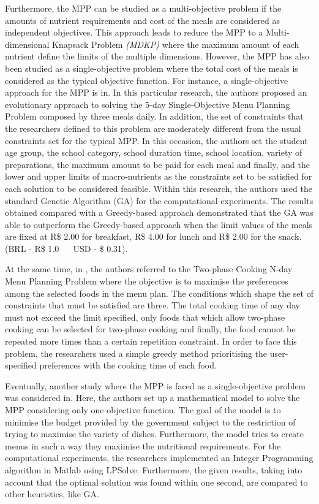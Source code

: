Furthermore, the MPP can be studied as a multi-objective problem\cite{Seljak2009} if the amounts of nutrient requirements and cost of the meals are considered as independent objectives. This approach leads to reduce the MPP to a Multi-dimensional Knapsack Problem \textit{(MDKP)} where the maximum amount of each nutrient define the limits of the multiple dimensions. However, the MPP has also been studied as a single-objective problem where the total cost of the meals is considered as the typical objective function. For instance, a single-objective approach for the MPP is in\cite{Moreira2018}. In this particular research, the authors proposed an evolutionary approach to solving the 5-day Single-Objective Menu Planning Problem composed by three meals daily. In addition, the set of constraints that the researchers defined to this problem are moderately different from the usual constraints set for the typical MPP. In this occasion, the authors set the student age group, the school category, school duration time, school location, variety of preparations, the maximum amount to be paid for each meal and finally, and the lower and upper limits of macro-nutrients as the constraints set to be satisfied for each solution to be considered feasible. Within this research, the authors used the standard Genetic Algorithm (GA) for the computational experiments. The results obtained compared with a Greedy-based approach demonstrated that the GA was able to outperform the Greedy-based approach when the limit values of the meals are fixed at R\$ 2.00 for breakfast, R\$ 4.00 for lunch and R\$ 2.00 for the snack. (BRL - R\$ 1.0 ~~ USD - \$ 0.31).

At the same time, in \cite{Funabiki2011}, the authors referred to the Two-phase Cooking N-day Menu Planning Problem where the objective is to maximise the preferences among the selected foods in the menu plan. The conditions which shape the set of constraints that must be satisfied are three. The total cooking time of any day must not exceed the limit specified, only foods that which allow two-phase cooking can be selected for two-phase cooking and finally, the food cannot be repeated more times than a certain repetition constraint. In order to face this problem, the researchers used a simple greedy method prioritising the user-specified preferences with the cooking time of each food.

Eventually, another study where the MPP is faced as a single-objective problem was considered in\cite{Sufahani2014}. Here, the authors set up a mathematical model to solve the MPP considering only one objective function. The goal of the model is to minimise the budget provided by the government subject to the restriction of trying to maximise the variety of dishes. Furthermore, the model tries to create menus in such a way they maximise the nutritional requirements. For the computational experiments, the researchers implemented an Integer Programming algorithm in Matlab using LPSolve. Furthermore, the given results, taking into account that the optimal solution was found within one second, are compared to other heuristics, like GA.

